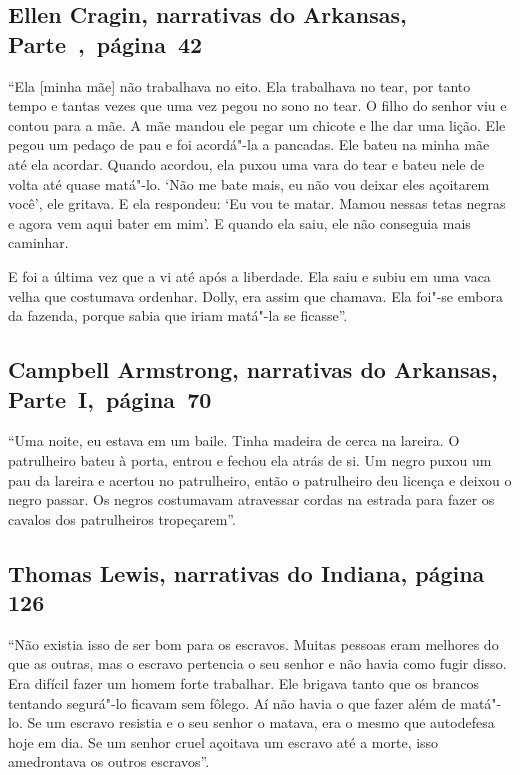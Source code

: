 \subsection{Ellen Cragin, narrativas do Arkansas, Parte~,~página~42} \label{ref59}

``Ela {[}minha mãe{]} não trabalhava no eito. Ela trabalhava no tear,
por tanto tempo e tantas vezes que uma vez pegou no sono no tear. O
filho do senhor viu e contou para a mãe. A mãe mandou ele pegar um
chicote e lhe dar uma lição. Ele pegou um pedaço de pau e foi acordá"-la
a pancadas. Ele bateu na minha mãe até ela acordar. Quando acordou, ela
puxou uma vara do tear e bateu nele de volta até quase matá"-lo. `Não me
bate mais, eu não vou deixar eles açoitarem você', ele gritava. E ela
respondeu: `Eu vou te matar. Mamou nessas tetas negras e agora vem aqui
bater em mim'. E quando ela saiu, ele não conseguia mais caminhar.

E foi a última vez que a vi até após a liberdade. Ela saiu e subiu em
uma vaca velha que costumava ordenhar. Dolly, era assim que chamava. Ela
foi"-se embora da fazenda, porque sabia que iriam matá"-la se ficasse''.

\subsection{Campbell Armstrong, narrativas do Arkansas, Parte~I,~página~70} \label{ref12}

``Uma noite, eu estava em um baile. Tinha madeira de cerca na lareira. O
patrulheiro bateu à porta, entrou e fechou ela atrás de si. Um negro
puxou um pau da lareira e acertou no patrulheiro, então o patrulheiro
deu licença e deixou o negro passar. Os negros costumavam atravessar
cordas na estrada para fazer os cavalos dos patrulheiros tropeçarem''.

\subsection{Thomas Lewis, narrativas do Indiana, página 126}
\label{ref178}

``Não existia isso de ser bom para os escravos. Muitas pessoas eram
melhores do que as outras, mas o escravo pertencia o seu senhor e não %
havia como fugir disso. Era difícil fazer um homem forte trabalhar. Ele
brigava tanto que os brancos tentando segurá"-lo ficavam sem fôlego. Aí
não havia o que fazer além de matá"-lo. Se um escravo resistia e o seu
senhor o matava, era o mesmo que autodefesa hoje em dia. Se um senhor
cruel açoitava um escravo até a morte, isso amedrontava os outros
escravos''.

